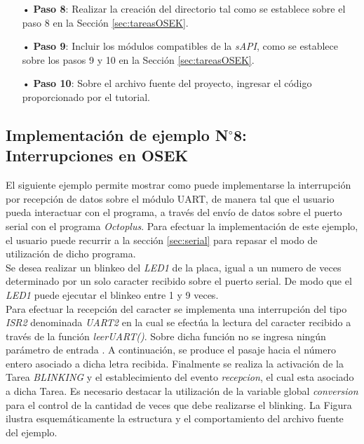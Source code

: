 \documentclass[12pt,letterpaper]{article}
\begin{document}
\begin{enumerate}
\item[•]\textbf{Paso 8}: Realizar la creación del directorio tal como se establece sobre el paso 8 en la Sección \ref{sec:tareasOSEK}.
\item[•]\textbf{Paso 9}: Incluir los módulos compatibles de la \textit{sAPI}, como se establece sobre los pasos 9 y 10 en la Sección \ref{sec:tareasOSEK}.
\item[•]\textbf{Paso 10}: Sobre el archivo fuente del proyecto, ingresar el código proporcionado por el tutorial.
\end{enumerate}
\subsection{Implementación de ejemplo N$^{\circ}$8: Interrupciones en OSEK}
El siguiente ejemplo permite mostrar como puede implementarse la interrupción por recepción de datos sobre el módulo UART, de manera tal que el usuario pueda interactuar con el programa, a través del envío de datos sobre el puerto serial con el programa \textit{Octoplus}. Para efectuar la implementación de este ejemplo, el usuario puede recurrir a la sección \ref{sec:serial} para repasar el modo de utilización de dicho programa.
 \\
 
Se desea realizar un blinkeo del \textit{LED1} de la placa, igual a un numero de veces determinado por un solo caracter recibido sobre el puerto serial. De modo que el \textit{LED1} puede ejecutar el blinkeo entre 1 y 9 veces.
 \\
 
Para efectuar la recepción del caracter se implementa una interrupción del tipo \textit{ISR2} denominada \textit{UART2} en la cual se efectúa la lectura del caracter recibido a través de la función \textit{leerUART()}. Sobre dicha función no se ingresa ningún parámetro de entrada . A continuación, se produce el pasaje hacia el número entero asociado a dicha letra recibida. Finalmente se realiza la activación de la Tarea \textit{BLINKING} y el establecimiento del evento \textit{recepcion}, el cual esta asociado a dicha Tarea. Es necesario destacar la utilización de la variable global \textit{conversion} para el control de la cantidad de veces que debe realizarse el blinking. La Figura  ilustra esquemáticamente la estructura y el comportamiento del archivo fuente del ejemplo.
\end{document}
